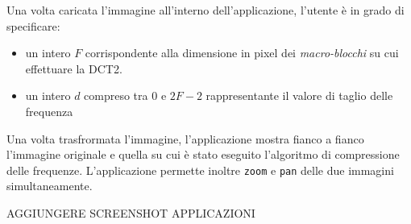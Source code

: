 \documentclass[a4paper, 12pt]{article}
\begin{document}
Una volta caricata l'immagine all'interno dell'applicazione, l'utente è in grado
di specificare:

\begin{itemize}
  \item un intero $F$ corrispondente alla dimensione in pixel dei
        \textit{macro-blocchi} su cui effettuare la DCT2.
  \item un intero $d$ compreso tra $0$ e $2F - 2$ rappresentante il valore di
        taglio delle frequenza
\end{itemize}

Una volta trasfrormata l'immagine, l'applicazione mostra fianco a fianco
l'immagine originale e quella su cui è stato eseguito l'algoritmo di
compressione delle frequenze. L'applicazione permette inoltre \texttt{zoom} e
\texttt{pan} delle due immagini simultaneamente.

\textsc{AGGIUNGERE SCREENSHOT APPLICAZIONI}
\end{document}
